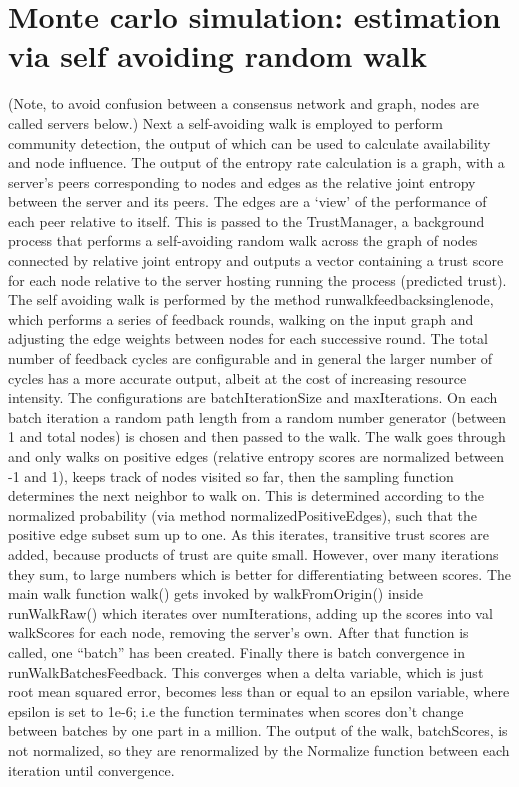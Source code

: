\documentclass{article}
\begin{document}
\section{Monte carlo simulation: estimation via self avoiding random walk}
(Note, to avoid confusion between a consensus network and graph, nodes are called servers below.)
	Next a self-avoiding walk is employed to perform community detection, the output of which can be used to calculate availability and node influence. 
The output of the entropy rate calculation is a graph, with a server’s peers corresponding to nodes and edges as the relative joint entropy between the server and its peers. The edges are a ‘view’ of the performance of each peer relative to itself. This is passed to the TrustManager, a background process that performs a self-avoiding random walk across the graph of nodes connected by relative joint entropy and outputs a vector containing a trust score for each node relative to the server hosting running the process (predicted trust).
The self avoiding walk is performed by the method runwalkfeedbacksinglenode, which performs a series of feedback rounds, walking on the input graph and adjusting the edge weights between nodes for each successive round. The total number of feedback cycles are configurable and in general the larger number of cycles has a more accurate output, albeit at the cost of increasing resource intensity. The configurations are batchIterationSize and maxIterations. On each batch iteration a random path length from a random number generator (between 1 and total nodes) is chosen and then passed to the walk. The walk goes through and only walks on positive edges (relative entropy scores are normalized between -1 and 1), keeps track of nodes visited so far, then the sampling function determines the next neighbor to walk on. This is determined according to the normalized probability (via method normalizedPositiveEdges), such that the positive edge subset sum up to one.
As this iterates, transitive trust scores are added, because products of trust are quite small. However, over many iterations they sum, to large numbers which is better for differentiating between scores. The main walk function walk() gets invoked by walkFromOrigin() inside runWalkRaw() which iterates over numIterations, adding up the scores into val walkScores for each node, removing the server’s own. After that function is called, one “batch” has been created. 
Finally there is batch convergence in runWalkBatchesFeedback. This converges when a delta variable, which is just root mean squared error, becomes less than or equal to an epsilon variable, where epsilon is set to 1e-6; i.e the function terminates when scores don’t change between batches by one part in a million. The output of the walk, batchScores, is not normalized, so they are renormalized by the Normalize function between each iteration until convergence.
\end{document}
